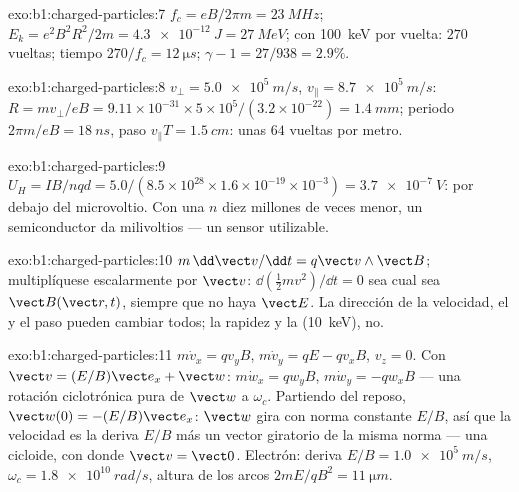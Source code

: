 \begin{solution}{exo:b1:charged-particles:7}
$f_c = eB/2\pi m = \qty{23}{MHz}$; $E_k = e^2B^2R^2/2m = \qty{4.3e-12}{J} =
\qty{27}{MeV}$; con \qty{100}{keV} por vuelta: $270$ vueltas; tiempo $270/f_c =
\qty{12}{\micro s}$; $\gamma - 1 = 27/938 = 2.9\%$.
\end{solution}

\begin{solution}{exo:b1:charged-particles:8}
$v_\perp = \qty{5.0e5}{m/s}$, $v_\parallel = \qty{8.7e5}{m/s}$: $R = mv_\perp/eB
= 9.11\times10^{-31} \times 5\times10^5/(3.2\times10^{-22}) = \qty{1.4}{mm}$;
periodo $2\pi m/eB = \qty{18}{ns}$, paso $v_\parallel T = \qty{1.5}{cm}$:
unas $64$ vueltas por metro.
\end{solution}

\begin{solution}{exo:b1:charged-particles:9}
$U_H = IB/nqd = 5.0/(8.5\times10^{28} \times 1.6\times10^{-19} \times 10^{-3})
= \qty{3.7e-7}{V}$: por debajo del microvoltio. Con una $n$ diez millones
de veces menor, un semiconductor da milivoltios --- un sensor utilizable.
\end{solution}

\begin{solution}{exo:b1:charged-particles:10}
$m\,\dd\vect v/\dd t = q\vect v\wedge\vect B$; multiplíquese escalarmente por $\vect v$: $\dd(\tfrac12 mv^2)/
\dd t = 0$ sea cual sea $\vect B(\vect r, t)$, siempre que no haya $\vect E$.
La dirección de la velocidad, el  y el paso pueden
cambiar todos; la rapidez y la  (\qty{10}{keV}), no.
\end{solution}

\begin{solution}{exo:b1:charged-particles:11}
$m\dot v_x = qv_yB$, $m\dot v_y = qE - qv_xB$, $v_z = 0$. Con $\vect v =
(E/B)\vect e_x + \vect w$: $m\dot w_x = qw_yB$, $m\dot w_y = -qw_xB$ --- una
rotación ciclotrónica pura de $\vect w$ a $\omega_c$. Partiendo del reposo,
$\vect w(0) = -(E/B)\vect e_x$: $\vect w$ gira con norma constante $E/B$, así
que la velocidad es la deriva $E/B$ más un vector giratorio de la misma
norma --- una cicloide, con  donde $\vect v = \vect 0$.
Electrón: deriva $E/B =
\qty{1.0e5}{m/s}$, $\omega_c = \qty{1.8e10}{rad/s}$, altura de los arcos $2mE/qB^2 =
\qty{11}{\micro m}$.
\end{solution}

